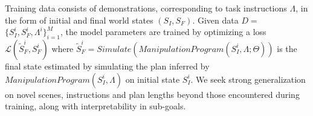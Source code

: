 %
%
Training data consists of demonstrations, corresponding to task instructions $\Lambda$, in the form of initial 
and final 
world states $(S_I, S_F)$.
%
Given data $D$$=$$\{ S^{i}_I, S^{i}_F, \Lambda^{i} \}^{M}_{i=1}$, the model parameters are trained by optimizing a loss 
$\mathcal{L}(\tilde{S}_F^{i},S_F^{i})$
%
where $\tilde{S}_F^{i}$$=$$Simulate(ManipulationProgram(S_I^{i}, \Lambda; \Theta))$ is the final state estimated by simulating the plan inferred by $ManipulationProgram(S_I^{i}, \Lambda)$ on initial state $S_I^i$.  
% 
We seek strong generalization on novel scenes, instructions and plan lengths 
beyond those encountered during training, along with interpretability in sub-goals. 
